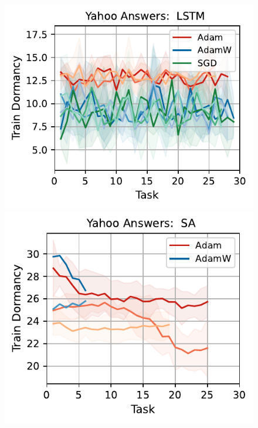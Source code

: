 \begin{figure}[htb!]
{    \includegraphics[width=\textwidth]{figs/Dormancy/nlp/lstm/yahoo_answers_50.pdf}
    \includegraphics[width=\textwidth]{figs/Dormancy/nlp/attention/yahoo_answers_40.pdf}
}
\end{figure}
